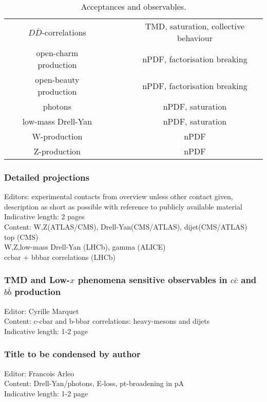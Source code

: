 \documentclass[../report.tex]{subfiles}
\begin{document}
\begin{table}[htbp]
{\begin{tabular}{|c|c|c|c|c|c|}
       &  $D\bar{D}$-correlations     &          &        &                    & TMD, saturation, collective behaviour  \\
       &  open-charm production     &          &        &                    & nPDF, factorisation breaking \\ 
 &  open-beauty production     &          &        &                    & nPDF, factorisation breaking \\ 
&  photons     &          &        &                    & nPDF, saturation \\
&  low-mass Drell-Yan   &          &        &                    & nPDF, saturation
\\
&  W-production     &          &        &                    & nPDF \\
&  Z-production     &          &        &                    & nPDF
\\
\hline
\end{tabular}
\caption{Acceptances and observables.  }
}
\end{table}

\subsubsection{Detailed projections}
Editors: experimental contacts from overview unless other contact given, description as short as possible with reference to publicly available material \\
Indicative length: 2 pages \\
Content: W,Z(ATLAS/CMS), Drell-Yan(CMS/ATLAS), dijet(CMS/ATLAS)\\
top (CMS) \\
W,Z,low-mass Drell-Yan (LHCb), gamma (ALICE) \\
ccbar + bbbar correlations (LHCb)
\subsubsection{TMD and Low-$x$ phenomena sensitive observables in $c\bar{c}$ and $b\bar{b}$ production }
Editor:  Cyrille Marquet\\
Content: c-cbar and b-bbar correlations: heavy-mesons and dijets \\
Indicative length: 1-2 page
\subsubsection{Title to be condensed by author}
Editor: Francois Arleo\\
Content: Drell-Yan/photons, E-loss, pt-broadening in pA\\
Indicative length: 1-2 page
\end{document}
